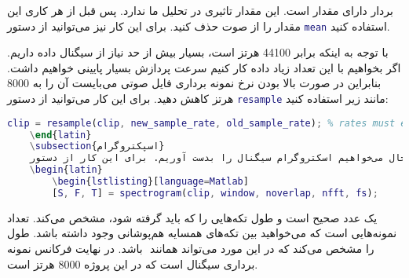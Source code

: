 \documentclass{utsignal}
\begin{document}
	بردار  دارای مقدار  است. این مقدار تاثیری در تحلیل ما ندارد. پس قبل از هر کاری این مقدار را از صوت حذف کنید. برای این کار نیز می‌توانید از دستور \lstinline[language=Matlab]{mean} استفاده کنید.
	
	با توجه به اینکه  برابر 44100 هرتز است، بسیار بیش از حد نیاز از سیگنال داده داریم. اگر بخواهیم با این تعداد زیاد داده کار کنیم سرعت پردازش بسیار پایینی خواهیم داشت. بنابراین در صورت بالا بودن نرخ نمونه برداری فایل صوتی می‌بایست آن را به 8000 هرتز کاهش دهید. برای این کار می‌توانید از دستور \lstinline[language=Matlab]{resample} مانند زیر استفاده کنید:
	\begin{latin}
		\begin{lstlisting}[language=Matlab]
	clip = resample(clip, new_sample_rate, old_sample_rate); % rates must each be integers.\end{lstlisting}
	\end{latin}
	\subsection{اسپکتروگرام}
	حال می‌خواهیم اسکتروگرام سیگنال را بدست آوریم. برای این کار از دستور \lstinline[language=Matlab]{spectrogram} استفاده کنید. با دستور در تمرین کامپیوتری دوم آشنا شدید. این دستور را به شکل زیر استفاده کنید:
	\begin{latin}
		\begin{lstlisting}[language=Matlab]
		[S, F, T] = spectrogram(clip, window, noverlap, nfft, fs);\end{lstlisting}
	\end{latin}
	 یک عدد صحیح است و طول تکه‌هایی را که باید   گرفته شود، مشخص می‌کند.  تعداد نمونه‌هایی است که می‌خواهید بین تکه‌های همسایه هم‌پوشانی وجود داشته باشد.  طول  را مشخص می‌کند که در این مورد می‌تواند همانند ‌ باشد. در نهایت  فرکانس نمونه برداری سیگنال است که در این پروژه 8000 هرتز است.
\end{document}
